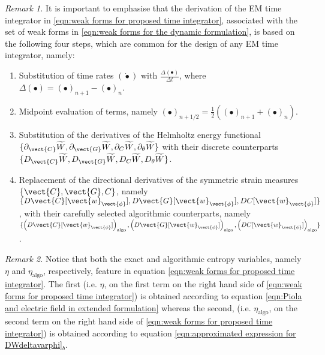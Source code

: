 \noindent\makebox[\linewidth]{\rule{\textwidth}{0.4pt}}
%
{\noindent \textit{Remark 1.} It is important to emphasise that the derivation of the EM time integrator in \eqref{eqn:weak forms for proposed time integrator}, associated with the set of weak forms in \eqref{eqn:weak forms for the dynamic formulation}, is based on the following four steps, which are common for the design of any EM time integrator, namely: 
	
	\begin{enumerate}
		\item Substitution of time rates $(\dot{\bullet})$ with $\frac{\Delta(\bullet)}{\Delta t}$, where $\Delta(\bullet) = (\bullet)_{n+1} - (\bullet)_n$.
		
		\item Midpoint evaluation of terms, namely  $({\bullet})_{n+1/2}=\frac{1}{2}\left((\bullet)_{n+1} + (\bullet)_{n}\right)$.
		
		\item Substitution of the derivatives of the Helmholtz energy functional $\{\partial_{\vect{C}}\widetilde{W},\partial_{\vect{G}}\widetilde{W},\partial_{C}\widetilde{W},\partial_{\theta}\widetilde{W}\}$ with their discrete counterparts $\{D_{\vect{C}}\widetilde{W},D_{\vect{G}}\widetilde{W},D_{C}\widetilde{W},D_{\theta}\widetilde{W}\}$. 
		
		\item Replacement of the directional derivatives of the symmetric strain measures $\{\vect{C},\vect{G},C\}$, namely $\{D\vect{C}[\vect{w}_{\vect{\phi}}],D\vect{G}[\vect{w}_{\vect{\phi}}],D{C}[\vect{w}_{\vect{\phi}}]\}$, with their carefully selected algorithmic counterparts, namely $\{\left(D\vect{C}[\vect{w}_{\vect{\phi}}]\right)_{\text{algo}},\left(D\vect{G}[\vect{w}_{\vect{\phi}}]\right)_{\text{algo}},\left(D{C}[\vect{w}_{\vect{\phi}}]\right)_{\text{algo}}\}$.
	\end{enumerate} 

\noindent\makebox[\linewidth]{\rule{\textwidth}{0.4pt}}

\noindent\makebox[\linewidth]{\rule{\textwidth}{0.4pt}}

{\noindent \textit{Remark 2.} Notice that both the exact and algorithmic entropy variables, namely $\eta$ and $\eta_{\text{algo}}$, respectively, feature in equation \eqref{eqn:weak forms for proposed time integrator}. The first (i.e. $\eta$, on the first term on the right hand side of \eqref{eqn:weak forms for proposed time integrator}) is obtained according to equation \eqref{eqn:Piola and electric field in extended formulation} whereas the second, (i.e. $\eta_{\text{algo}}$, on the second term on the right hand side of \eqref{eqn:weak forms for proposed time integrator}) is obtained according to equation \eqref{eqn:approximated expression for DWdeltavarphi}$_b$.
	
}}
